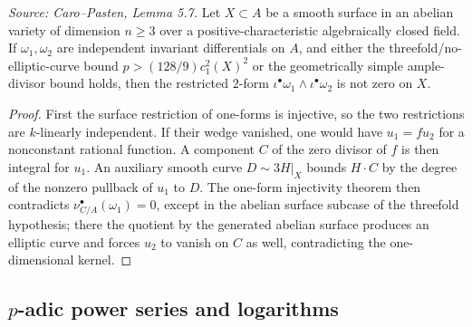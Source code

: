 \begin{lemma}
  \label{lem:cp_nonvanishing_two_forms}
  \textit{Source: Caro--Pasten, Lemma 5.7.}
  Let \(X\subset A\) be a smooth surface in an abelian variety of dimension
  \(n\ge3\) over a positive-characteristic algebraically closed field.  If
  \(\omega_1,\omega_2\) are independent invariant differentials on \(A\), and
  either the threefold/no-elliptic-curve bound
  \(p>(128/9)c_1^2(X)^2\) or the geometrically simple ample-divisor bound
  holds, then the restricted \(2\)-form
  \(\iota^\bullet\omega_1\wedge\iota^\bullet\omega_2\) is not zero on \(X\).
\end{lemma}
\begin{proof}
  First the surface restriction of one-forms is injective, so the two
  restrictions are \(k\)-linearly independent.  If their wedge vanished, one
  would have \(u_1=f u_2\) for a nonconstant rational function.  A component
  \(C\) of the zero divisor of \(f\) is then integral for \(u_1\).  An
  auxiliary smooth curve \(D\sim3H|_X\) bounds \(H\cdot C\) by the degree of
  the nonzero pullback of \(u_1\) to \(D\).  The one-form injectivity theorem
  then contradicts \(\nu_{C/A}^\bullet(\omega_1)=0\), except in the abelian
  surface subcase of the threefold hypothesis; there the quotient by the
  generated abelian surface produces an elliptic curve and forces \(u_2\) to
  vanish on \(C\) as well, contradicting the one-dimensional kernel.
\end{proof}

\subsection{\texorpdfstring{\(p\)}{p}-adic power series and logarithms}

